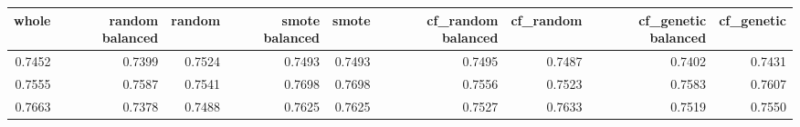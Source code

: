 \begin{tabular}{rrrrrrrrr}
\toprule

 whole &  random balanced &  random &  smote balanced &  smote &  cf\_random balanced &  cf\_random &  cf\_genetic balanced &  cf\_genetic \\
\midrule

0.7452 &           0.7399 &  0.7524 &          0.7493 & 0.7493 &              0.7495 &     0.7487 &               0.7402 &      0.7431 \\
0.7555 &           0.7587 &  0.7541 &          0.7698 & 0.7698 &              0.7556 &     0.7523 &               0.7583 &      0.7607 \\
0.7663 &           0.7378 &  0.7488 &          0.7625 & 0.7625 &              0.7527 &     0.7633 &               0.7519 &      0.7550 \\

\bottomrule
\end{tabular}
